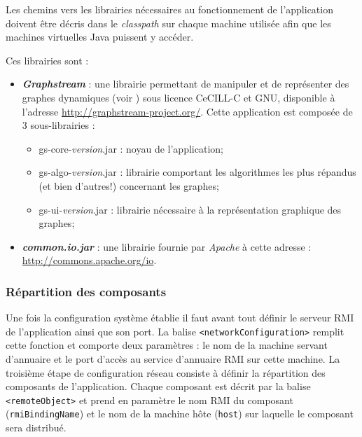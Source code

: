 Les chemins vers les librairies nécessaires au fonctionnement de l'application doivent être décris dans le \textit{classpath} sur chaque machine utilisée afin que les machines virtuelles Java puissent y accéder. 

Ces librairies sont : 
\begin{itemize}
 \item \textbf{\textit{Graphstream}} : une librairie permettant de manipuler et de représenter des graphes dynamiques (voir \cite{Dutot2007}) sous licence CeCILL-C et GNU, disponible à l'adresse \href{http://graphstream-project.org/}{http://graphstream-project.org/}. Cette application est composée de 3 sous-librairies : 
 \begin{itemize}
  \item gs-core-\textit{version}.jar : noyau de l'application;
  \item gs-algo-\textit{version}.jar : librairie comportant les algorithmes les plus répandus (et bien d'autres!) concernant les graphes;
  \item gs-ui-\textit{version}.jar : librairie nécessaire à la représentation graphique des graphes;
 \end{itemize}

 \item \textbf{\textit{common.io.jar}} : une librairie fournie par \textit{Apache} à cette adresse : \href{http://commons.apache.org/io}{http://commons.apache.org/io}.
\end{itemize}

\subsubsection{Répartition des composants}\label{chap:simulateur:sec:archi:distribution:reseau}

Une fois la configuration système établie il faut avant tout définir le serveur RMI de l'application ainsi que son port. La balise \verb!<networkConfiguration>! remplit cette fonction et comporte deux paramètres : le nom de la machine servant d'annuaire et le port d'accès au service d'annuaire RMI sur cette machine. La troisième étape de configuration réseau consiste à définir la répartition des composants de l'application. Chaque composant est décrit par la balise \verb!<remoteObject>! et prend en paramètre le nom RMI du composant (\verb!rmiBindingName!) et le nom de la machine hôte (\verb!host!) sur laquelle le composant sera distribué.

